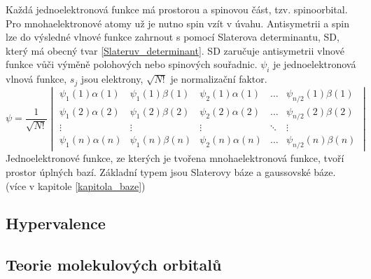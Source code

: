 \documentclass[
  digital, %
  table,   %
  lof,     %
  lot,     %
]{fithesis3}
\begin{document}
 Každá jednoelektronová funkce má prostorou a spinovou část, tzv. spinoorbital. Pro mnohaelektronové atomy už je nutno spin vzít v úvahu. Antisymetrii a spin lze do výsledné vlnové funkce zahrnout s pomocí Slaterova determinantu, SD, který má obecný tvar \ref{Slateruv_determinant}. SD zaručuje antisymetrii vlnové funkce vůči výměně polohových nebo spinových souřadnic. $\psi_i$ je jednoelektronová vlnová funkce, $s_j$ jsou elektrony, $\sqrt{N!}$ je normalizační faktor.
\begin{equation}
\psi =  \frac{1}{\sqrt{N!}}\begin{vmatrix}
\psi_1(1)\alpha(1) & \psi_1(1) \beta (1) & \psi_2(1)\alpha(1) & \dots & \psi_{n/2}(1)\beta(1) \\
\psi_1(2)\alpha(2) & \psi_1(2) \beta (2) & \psi_2(2)\alpha(2) & \dots & \psi_{n/2}(2)\beta(2) \\
\vdots             & \vdots              & \vdots             & \ddots & \vdots \\
\psi_1(n)\alpha(n) & \psi_1(n) \beta (n) & \psi_2(n)\alpha(n) & \dots & \psi_{n/2}(n)\beta(n) 
\end{vmatrix}
\label{Slateruv_determinant}
\end{equation}
Jednoelektronové funkce, ze kterých je tvořena mnohaelektronová funkce, tvoří prostor úplných bazí. Základní typem jsou Slaterovy báze a gaussovské báze. (více v kapitole \ref{kapitola_baze})




\subsection{Hypervalence}
\subsection{Teorie molekulových orbitalů}
\end{document}

